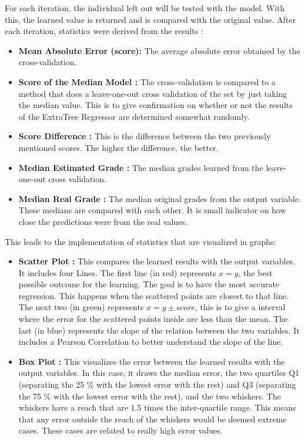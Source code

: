 \documentclass[a4paper,11pt]{report}
\numberwithin{figure}{chapter} %
\begin{document}
\begin{itemize}
        For each iteration, the individual left out will be tested with the model.
        With this, the learned value is returned and is compared with the original value.
        After each iteration, statistics were derived from the results :
        \begin{itemize}
            \item \textbf{Mean Absolute Error (score):} The average absolute error obtained by the cross-validation.
            \item \textbf{Score of the Median Model :} The cross-validation is compared to a method that does a leave-one-out cross validation of the set by just taking the median value.
            This is to give confirmation on whether or not the results of the ExtraTree Regressor are determined somewhat randomly.
            \item \textbf{Score Difference :} This is the difference between the two previously mentioned scores.
            The higher the difference, the better.
            \item \textbf{Median Estimated Grade :} The median grades learned from the leave-one-out cross validation.
            \item \textbf{Median Real Grade :} The median original grades  from the output variable.
            These medians are compared with each other.
            It is small indicator on how close the predictions were from the real values.
        \end{itemize}
        This leads to the implementation of statistics that are visualized in graphs:
        \begin{itemize}
            \item \textbf{Scatter Plot :} This compares the learned results with the output variables.
            It includes four Lines.
            The first line (in red) represents $x = y$, the best possible outcome for the learning.
            The goal is to have the most accurate regression.
            This happens when the scattered points are closest to that line.
            The next two (in green) represents $x = y \pm score$, this is to give a interval where the error for the scattered points inside are less than the mean.
            The last (in blue) represents the slope of the relation between the two variables.
            It includes a Pearson Correlation to better understand the slope of the line.
            \item \textbf{Box Plot :} This visualizes the error between the learned results with the output variables.
            In this case, it draws the median error, the two quartiles Q1 (separating the 25 \% with the lowest error with the rest) and Q3 (separating the 75 \% with the lowest error with the rest), and the two whiskers.
            The whiskers have a reach that are 1.5 times the inter-quartile range.
            This means that any error outside the reach of the whiskers would be deemed extreme cases.
            These cases are related to really high error values.
        \end{itemize}
    \end{itemize}
\end{document}

